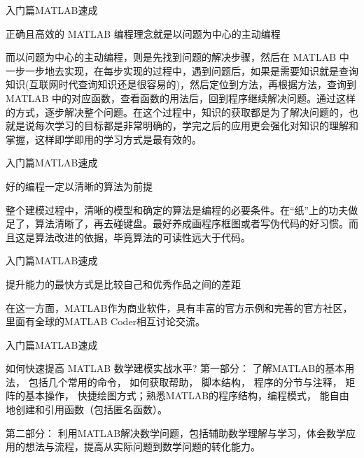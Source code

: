 \documentclass{beamer}
\begin{document}
\begin{frame}{入门篇}{MATLAB速成}
\begin{block}{正确且高效的 MATLAB 编程理念就是以问题为中心的主动编程}


而以问题为中心的主动编程，则是先找到问题的解决步骤，然后在 MATLAB 中一步一步地去实现，在每步实现的过程中，遇到问题后，如果是需要知识就是查询知识(互联网时代查询知识还是很容易的)，然后定位到方法，再根据方法，查询到 MATLAB 中的对应函数，查看函数的用法后，回到程序继续解决问题。通过这样的方式，逐步解决整个问题。在这个过程中，知识的获取都是为了解决问题的，也就是说每次学习的目标都是非常明确的，学完之后的应用更会强化对知识的理解和掌握，这样即学即用的学习方式是最有效的。

\end{block}
\end{frame}

\begin{frame}{入门篇}{MATLAB速成}
\begin{block}{好的编程一定以清晰的算法为前提}

整个建模过程中，清晰的模型和确定的算法是编程的必要条件。在“纸”上的功夫做足了，算法清晰了，再去碰键盘。最好养成画程序框图或者写伪代码的好习惯。而且这是算法改进的依据，毕竟算法的可读性远大于代码。

\end{block}
\end{frame}

\begin{frame}{入门篇}{MATLAB速成}
\begin{block}{提升能力的最快方式是比较自己和优秀作品之间的差距}

在这一方面，MATLAB作为商业软件，具有丰富的官方示例和完善的官方社区，里面有全球的MATLAB Coder相互讨论交流。
\end{block}
\end{frame}

\begin{frame}{入门篇}{MATLAB速成}
\begin{block}{如何快速提高 MATLAB 数学建模实战水平?}
{\color{blue} 第一部分：} 了解MATLAB的基本用法， 包括几个常用的命令， 如何获取帮助， 脚本结构， 程序的分节与注释， 矩阵的基本操作， 快捷绘图方式；熟悉MATLAB的程序结构，编程模式， 能自由地创建和引用函数（包括匿名函数）。

{\color{blue} 第二部分：} 利用MATLAB解决数学问题，包括辅助数学理解与学习，体会数学应用的想法与流程，提高从实际问题到数学问题的转化能力。

\end{block}
\end{frame}
\end{document}
